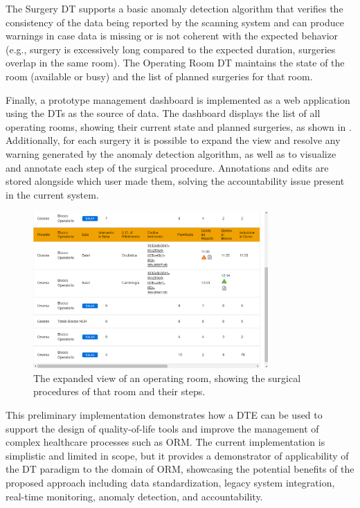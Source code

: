 The Surgery \ac{DT} supports a basic anomaly detection algorithm that verifies the consistency of the data being reported by the scanning system and can produce warnings in case data is missing or is not coherent with the expected behavior (e.g., surgery is excessively long compared to the expected duration, surgeries overlap in the same room).
%
The Operating Room \ac{DT} maintains the state of the room (available or busy) and the list of planned surgeries for that room.

Finally, a prototype management dashboard is implemented as a web application using the \acp{DT} as the source of data.
%
The dashboard displays the list of all operating rooms, showing their current state and planned surgeries, as shown in .
%
Additionally, for each surgery it is possible to expand the view and resolve any warning generated by the anomaly detection algorithm, as well as to visualize and annotate each step of the surgical procedure.
%
Annotations and edits are stored alongside which user made them, solving the accountability issue present in the current system. 

\begin{figure}
    \centering
    \includegraphics[width=0.8\textwidth]{figures/orm/interventi.png}
     \caption{The expanded view of an operating room, showing the surgical procedures of that room and their steps.}
    \label{fig:orm:surgical_procedures_dashboard}
\end{figure}


This preliminary implementation demonstrates how a \ac{DTE} can be used to support the design of quality-of-life tools and improve the management of complex healthcare processes such as ORM.
%
The current implementation is simplistic and limited in scope, but it provides a demonstrator of applicability of the \ac{DT} paradigm to the domain of ORM, showcasing the potential benefits of the proposed approach including data standardization, legacy system integration, real-time monitoring, anomaly detection, and accountability.
